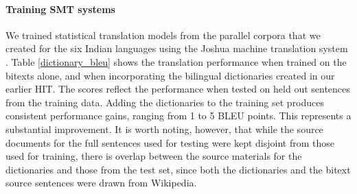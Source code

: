 \documentclass[11pt]{article}
\begin{document}
\paragraph{Training SMT systems}
We trained statistical translation models from the parallel corpora that we created for the six Indian languages using the Joshua machine translation system \cite{post2012constructing}. Table \ref{dictionary_bleu} shows the translation performance when trained on the bitexts alone, and when incorporating the bilingual dictionaries created in our earlier HIT. The scores reflect the performance when tested on held out sentences from the training data. Adding the dictionaries to the training set produces consistent performance gains, ranging from 1 to 5 BLEU points. This represents a substantial improvement. It is worth noting, however, that while the source documents for the full sentences used for testing were kept disjoint from those used for training, there is overlap between the source materials for the dictionaries and those from the test set, since both the dictionaries and the bitext source sentences were drawn from Wikipedia. 

\end{document}
